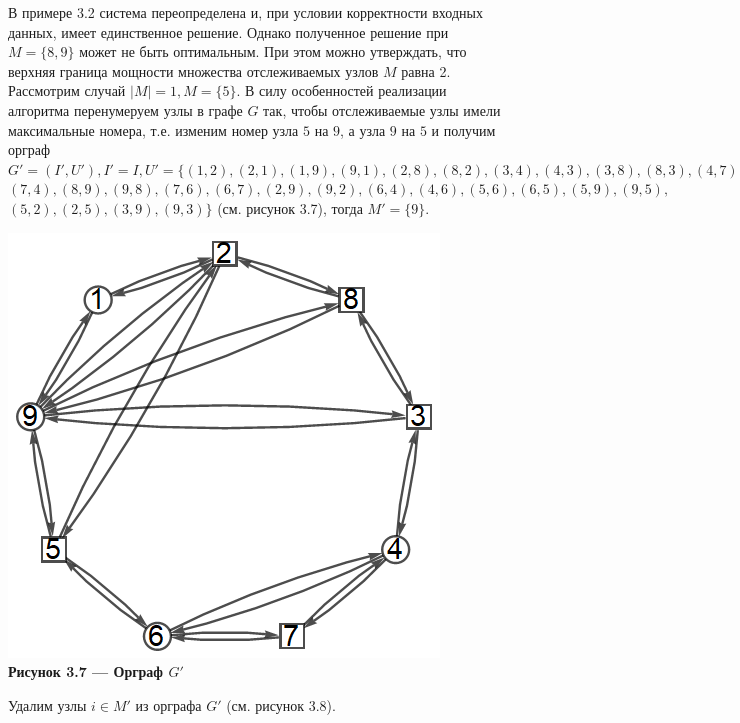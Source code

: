 \documentclass[14pt]{extarticle}%
\begin{document}
 В примере 3.2 система переопределена и, при условии корректности входных данных, имеет единственное решение. Однако полученное решение при $M=\{8,9\}$ может не быть оптимальным. При этом можно утверждать, что верхняя граница мощности множества отслеживаемых узлов $M$ равна 2. Рассмотрим случай $|M|=1, M=\{5\}$. В силу особенностей реализации алгоритма перенумеруем узлы в графе $G$ так, чтобы отслеживаемые узлы имели максимальные номера, т.е. изменим номер узла $5$ на $9$, а узла $9$ на $5$ и получим орграф $G'=(I',U'), I'=I,
U'=\{(1 , 2), (2 , 1), (1 , 9), (9 , 1), (2 , 8), (8 , 2), (3 , 4), (4 , 3), (3 , 8),  (8 , 3), (4 , 7),$\\
$ (7 , 4), (8 , 9), (9 , 8), (7 , 6), (6 , 7), (2 , 9), (9 , 2), (6 , 4), (4 , 6), (5 , 6), (6 , 5), (5 , 9), (9 , 5),$\\
$ (5 , 2), (2 , 5), (3 , 9), (9 , 3)\}$ (см. рисунок 3.7), тогда $M'=\{9\}$.

\begin{center}
\includegraphics[scale=0.6]{grs/baseg3.png}\\
\textbf{Рисунок 3.7 --- Орграф $G'$}
\end{center}

Удалим узлы $i\in M'$ из орграфа $G'$ (см. рисунок 3.8).
\end{document}
